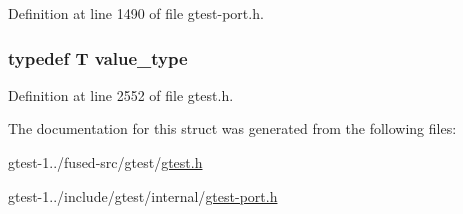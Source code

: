 \-Definition at line 1490 of file gtest-\/port.\-h.

\hypertarget{structtesting_1_1internal_1_1IteratorTraits_3_01const_01T_01_5_01_4_a265a253612b46abed17c61b0a5e5ce30}{
\subsubsection[{value\-\_\-type}]{\setlength{\rightskip}{0pt plus 5cm}typedef \-T {\bf value\-\_\-type}}}\label{da/da3/structtesting_1_1internal_1_1IteratorTraits_3_01const_01T_01_5_01_4_a265a253612b46abed17c61b0a5e5ce30}


\-Definition at line 2552 of file gtest.\-h.



\-The documentation for this struct was generated from the following files\-:\begin{DoxyCompactItemize}
\item 
gtest-\/1../fused-\/src/gtest/\hyperlink{fused-src_2gtest_2gtest_8h}{gtest.\-h}\item 
gtest-\/1../include/gtest/internal/\hyperlink{gtest-port_8h}{gtest-\/port.\-h}\end{DoxyCompactItemize}
